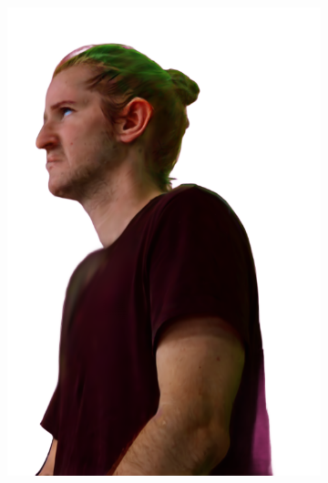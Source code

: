 \begin{figure}
\begin{subfigure}{0.18\linewidth}
        \includegraphics[width=\textwidth]{Figures/results/low/ephra_elf/27_render.png}
	\end{subfigure}
    \begin{subfigure}{0.18\linewidth}

\end{subfigure}
\end{figure}

